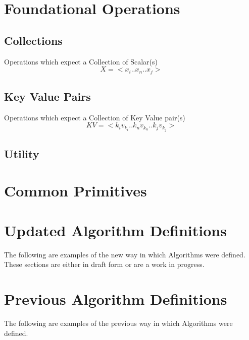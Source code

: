 \documentclass{article}
\begin{document}




\section{Foundational Operations}

\subsection{Collections}
Operations which expect a Collection of Scalar(s)
$$X = <x_{i}..x_{n}..x_{j}>$$





\subsection{Key Value Pairs}
Operations which expect a Collection of Key Value pair(s)
$$KV = <k_{i}v_{k_{i}}..k_{n}v_{k_{n}}..k_{j}v_{k_{j}}>$$





\subsection{Utility}







\section{Common Primitives}




\section*{Updated Algorithm Definitions}
The following are examples of the new way in which Algorithms were defined. These sections are either in draft form or are a work in progress.





\section*{Previous Algorithm Definitions}
The following are examples of the previous way in which Algorithms were defined.






\end{document}
